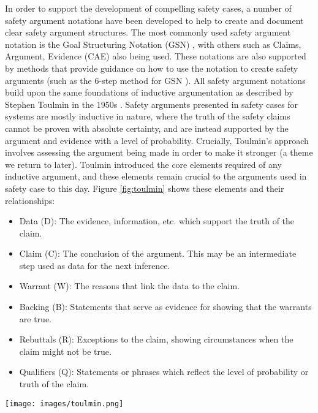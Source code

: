 In order to support the development of compelling safety cases, a number of safety argument notations have been developed to help to create and document clear safety argument structures. The most commonly used safety argument notation is the Goal Structuring Notation (GSN) \cite{group2021a}, with others such as Claims, Argument, Evidence (CAE) \cite{cae} also being used. These notations are also supported by methods that provide guidance on how to use the notation to create safety arguments (such as the 6-step method for GSN \cite{kelly1999arguing}). All safety argument notations build upon the same foundations of inductive argumentation as described by Stephen Toulmin in the 1950s \cite{toulmin2003uses}. Safety arguments presented in safety cases for systems are mostly inductive in nature, where the truth of the safety claims cannot be proven with absolute certainty, and are instead supported by the argument and evidence with a level of probability. Crucially, Toulmin's approach involves assessing the argument being made in order to make it stronger (a theme we return to later). Toulmin introduced the core elements required of any inductive argument, and these elements remain crucial to the arguments used in safety case to this day. Figure \ref{fig:toulmin} shows these elements and their relationships:
\begin{itemize}
    \item Data (D): The evidence, information, etc. which support the truth of the claim. 
    \item Claim (C): The conclusion of the argument. This may be an intermediate step used as data for the next inference.
    \item Warrant (W): The reasons that link the data to the claim. 
    \item Backing (B): Statements that serve as evidence for showing that the warrants are true.
    \item Rebuttals (R): Exceptions to the claim, showing circumstances when the claim might not be true.
    \item Qualifiers (Q): Statements or phrases which reflect the level of probability or truth of the claim.
\end{itemize}


\begin{figure*}
\centering
\texttt{[image: images/toulmin.png]}
\caption{Toulmin's model of inductive arguments (from \cite{toulmin2003uses}).}
\label{fig:toulmin}
\end{figure*}


